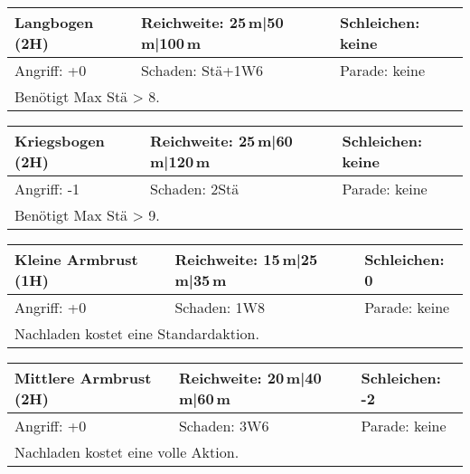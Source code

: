 \documentclass[../../Heldenanleitung2]{subfiles}
\begin{document}
\begin{tabular}{|p{}|p{}|p{}|}
\hline
\textbf{Langbogen (2H)} & Reichweite: 25\,m|50\,m|100\,m & Schleichen: keine\\
\hline
Angriff: +0 & Schaden: Stä+1W6 & Parade: keine\\
\hline
\multicolumn{3}{|p{0.99\textwidth}|}{Benötigt Max Stä > 8.} \\
\hline
\end{tabular}
\newline \newline\newline
\begin{tabular}{|p{}|p{}|p{}|}
\hline
\textbf{Kriegsbogen (2H)} & Reichweite: 25\,m|60\,m|120\,m & Schleichen: keine\\
\hline
Angriff: -1 & Schaden: 2Stä & Parade: keine \\
\hline
\multicolumn{3}{|p{0.99\textwidth}|}{Benötigt Max Stä > 9.} \\
\hline
\end{tabular}
\newline \newline\newline
\begin{tabular}{|p{}|p{}|p{}|}
\hline
\textbf{Kleine Armbrust (1H)} & Reichweite: 15\,m|25\,m|35\,m & Schleichen: 0 \\
\hline
Angriff: +0 & Schaden: 1W8 & Parade: keine\\
\hline
\multicolumn{3}{|p{0.99\textwidth}|}{Nachladen kostet eine Standardaktion.} \\
\hline
\end{tabular}
\newline \newline\newline
\begin{tabular}{|p{}|p{}|p{}|}
\hline
\textbf{Mittlere Armbrust (2H)} & Reichweite: 20\,m|40\,m|60\,m & Schleichen: -2\\
\hline
Angriff: +0 & Schaden: 3W6 & Parade: keine\\
\hline
\multicolumn{3}{|p{0.99\textwidth}|}{Nachladen kostet eine volle Aktion.} \\
\hline
\end{tabular}
\newline \newline\newline
\end{document}
